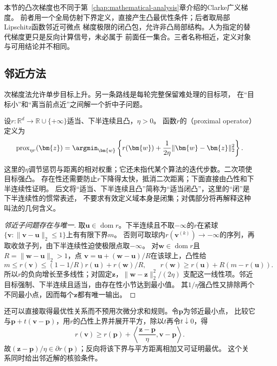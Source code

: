 本节的凸次梯度也不同于第~\ref{chap:mathematical-analysis}章介绍的Clarke广义梯度。
前者用一个全局仿射下界定义，直接产生凸最优性条件；后者取局部Lipschitz函数邻近可微点
梯度极限的闭凸包，允许非凸局部结构。人为指定的替代梯度更只是反向计算信号，未必属于
前面任一集合。三者名称相近，定义对象与可用结论并不相同。

\subsection{邻近方法}
\label{sec:opt-nonsmooth-proximal}
\label{sec:opt-weaker-curvature}

次梯度法允许单步目标上升。另一条路线是每轮完整保留难处理的目标项，
在“目标小”和“离当前点近”之间解一个折中子问题。
\begin{definition}[凸函数的邻近算子]
\label{def:opt-proximal-operator}
设$r:\mathbb R^d\to\mathbb R\cup\{+\infty\}$适当、下半连续且凸，$\eta>0$。
函数$r$的（proximal operator）定义为
\[
  \operatorname{prox}_{\eta r}(\bm{z})
  =\argmin_{\bm{w}}
  \left\{r(\bm{w})+\frac{1}{2\eta}
  \lVert\bm{w}-\bm{z}\rVert_2^2\right\}.
\]
\end{definition}
这里的$\eta$调节惩罚与距离的相对权重；它还未指代某个算法的迭代步数。二次项使目标强凸。
存在性还需要防止$r$下降得太快，抵消二次距离；下面直接由凸性和下半连续性证明。
后文将“适当、下半连续且凸”简称为“适当闭凸”，这里的“闭”是下半连续性的惯常表述，
不要求有效定义域本身是闭集；对偶部分将再解释这种叫法的几何含义。

\begin{proof}[邻近子问题存在与唯一]
取$\bm u\in\operatorname{dom}r$。下半连续且不取$-\infty$的$r$在紧球
$\{\bm v:\|\bm v-\bm u\|_2\leq1\}$上有有限下界$m$。
否则可取球内$r(\bm v^{(k)})\to-\infty$的序列，再取收敛子列，由下半连续性迫使极限点取$-\infty$。
对$\bm w\in\operatorname{dom}r$且$R=\|\bm w-\bm u\|_2>1$，点
$\bm v=\bm u+(\bm w-\bm u)/R$在该球上，凸性给
\[
 m\leq r(\bm v)\leq(1-1/R)r(\bm u)+r(\bm w)/R,
 \qquad
 r(\bm w)\geq r(\bm u)+R(m-r(\bm u)).
\]
所以$r$的负向增长至多线性；对固定$\bm z$，$\|\bm w-\bm z\|_2^2/(2\eta)$
支配这一线性项。邻近目标强制、下半连续且适当，由存在性小节达到最小值。
其$1/\eta$强凸性又排除两个不同最小点，因而每个$\bm z$都有唯一输出。
\end{proof}

还可以直接取得最优性关系而不预用次微分求和规则。令$\bm p$为邻近最小点，
比较它与$\bm p+t(\bm v-\bm p)$，用$r$的凸性上界并展开平方，除以$t$再令$t\downarrow0$，得
\[
 r(\bm v)\geq r(\bm p)+
 \left\langle\frac{\bm z-\bm p}{\eta},\bm v-\bm p\right\rangle.
\]
故$(\bm z-\bm p)/\eta\in\partial r(\bm p)$；反向将该下界与平方距离相加又可证明最优。
这个关系同时给出邻近解的核验条件。


